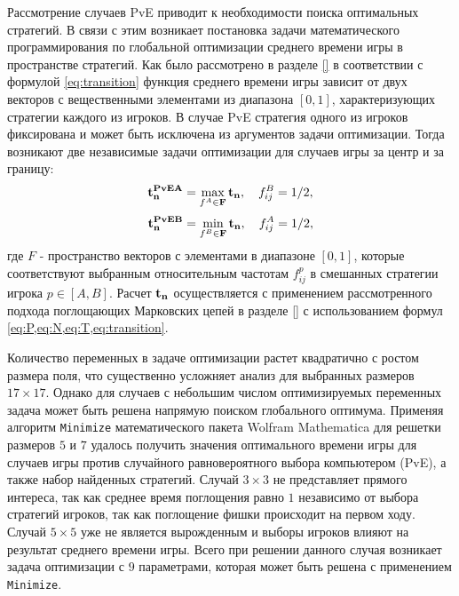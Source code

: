 Рассмотрение случаев PvE приводит к необходимости поиска оптимальных стратегий. В связи с этим возникает постановка задачи 
математического программирования по глобальной оптимизации среднего времени игры в пространстве стратегий. 
Как было рассмотрено в разделе \cref{} в соответствии с формулой \eqref{eq:transition} функция среднего времени игры
зависит от двух векторов с вещественными элементами из диапазона $[0, 1]$, характеризующих стратегии каждого из игроков.
В случае PvE стратегия одного из игроков фиксирована и может быть исключена из аргументов задачи оптимизации.
Тогда возникают две независимые задачи оптимизации для случаев игры за центр и за границу:
\begin{equation}
    \begin{aligned}
    {\bf t_n^{PvEA}} = \max_{f^A \in {\bf F}} {\bf t_n}, \hspace{1em} f_{ij}^B=1/2,
    \label{eq:centeropt}
    \end{aligned}
\end{equation}
\begin{equation}
    \begin{aligned}
    {\bf t_n^{PvEB}} = \min_{f^B \in {\bf F}} {\bf t_n}, \hspace{1em}  f_{ij}^A=1/2,
    \label{eq:borderopt}
    \end{aligned}
\end{equation}
где $F$ - пространство векторов с элементами в диапазоне $[0, 1]$, которые соответствуют выбранным относительным частотам $f_{ij}^p$
в смешанных стратегии игрока $p \in [A, B]$. Расчет ${\bf t_n}$ осуществляется с применением рассмотренного подхода поглощающих Марковских цепей
в разделе \cref{} с использованием формул \eqref{eq:P,eq:N,eq:T,eq:transition}.

Количество переменных в задаче оптимизации растет квадратично с ростом размера поля, что существенно усложняет анализ для выбранных размеров $17 \times 17$.
Однако для случаев с небольшим числом оптимизируемых переменных задача может быть решена напрямую поиском глобального оптимума.
Применяя алгоритм \texttt{Minimize} математического пакета Wolfram Mathematica для решетки размеров $5$ и $7$ удалось получить значения
оптимального времени игры для случаев игры против случайного равновероятного выбора компьютером (PvE), а также набор найденных стратегий.
Случай $3 \times 3$ не представляет прямого интереса, так как среднее время поглощения равно $1$ независимо от выбора стратегий игроков, 
так как поглощение фишки происходит на первом ходу. Случай $5 \times 5$ уже не является вырожденным и выборы игроков влияют на результат среднего времени игры.
Всего при решении данного случая возникает задача оптимизации с $9$ параметрами, которая может быть решена с применением \texttt{Minimize}.

